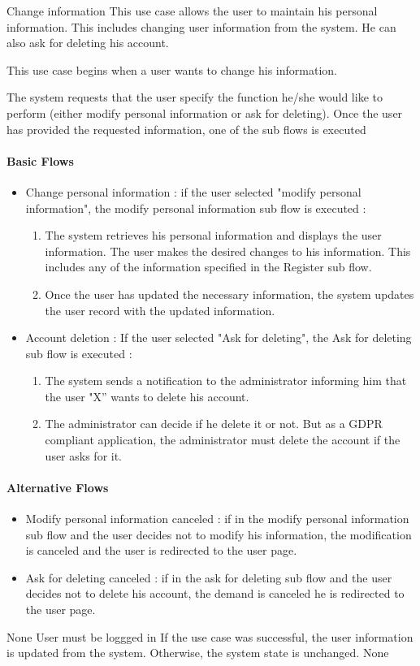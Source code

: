 \subusecasedesc
{Change information}
{
  This use case allows the user to maintain his personal information. This includes changing user information from the system. He can also ask for deleting his account.
}
{
  This use case begins when a user wants to change his information.

  The system requests that the user specify the function he/she would like to perform (either modify personal information or ask for deleting). Once the user has provided the requested information, one of the sub flows is executed

  \paragraph{Basic Flows}
  \begin{itemize}
    \item Change personal information : if the user selected "modify personal information", the modify personal information sub flow is executed :
    \begin{enumerate}
      \item The system retrieves his personal information and displays the user information. The user makes the desired changes to his information. This includes any of the information specified in the Register sub flow.
      \item Once the user has updated the necessary information, the system updates the user record with the updated information.
    \end{enumerate}
    \item Account deletion : If the user selected "Ask for deleting", the Ask for deleting sub flow is executed :
    \begin{enumerate}
      \item The system sends a notification to the administrator informing him that the user "X” wants to delete his account.
      \item The administrator can decide if he delete it or not. But as a GDPR compliant application, the administrator must delete the account if the user asks for it.
    \end{enumerate}
  \end{itemize}

  \paragraph{Alternative Flows}
  \begin{itemize}
    \item Modify personal information canceled : if in the modify personal information sub flow and the user decides not to modify his information, the modification is canceled and the user is redirected to the user page.
    \item Ask for deleting canceled : if in the ask for deleting sub flow and the user decides not to delete his account, the demand is canceled he is redirected to the user page.
  \end{itemize}
}
{None}
{User must be loggged in}
{If the use case was successful, the user information is updated from the system.  Otherwise, the system state is unchanged.}
{None}

